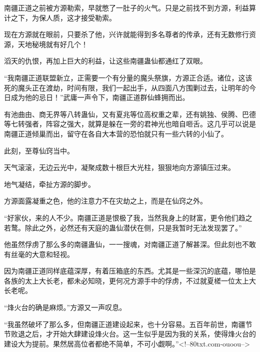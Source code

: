 \begin{this_body}
南疆正道之前被方源勒索，早就憋了一肚子的火气。只是之前找不到方源，利益算计之下，为保人质，这才接受勒索。

现在方源就在眼前，只要杀了他，兴许就能得到多名尊者的传承，还有无数修行资源，天地秘境就有好几个！

滔天的仇恨，再加上巨大的利益，让这些南疆蛊仙都通红了双眼。

“我南疆正道联盟新立，正需要一个有分量的魔头祭旗，方源正合适。诸位，这该死的魔头正在渡劫，时间有限，我们一起出手，从四面八方围剿过去，让明年的今日成为他的忌日！”武庸一声令下，南疆正道群仙蜂拥而出。

有池曲由、商无界等八转蛊仙，又有夏兆等位高权重之辈，还有姚独、侯腾、巴德等七转强者，阵容之强大，就算是躲在一旁的君神光也暗自咂舌。这几乎可以说是南疆正道倾巢而出，留守在各自大本营的恐怕就只有一些六转的小仙了。

此刻，至尊仙窍当中。

天气滚滚，无边云光中，凝聚成数十根巨大光柱，狠狠地向方源镇压过来。

地气凝结，牵扯方源的脚步。

方源面露凝重之色，他的注意力不在灾劫之上，而是在仙窍之外。

“好家伙，来的人不少。南疆正道是恨极了我，当然我身上的财富，更令他们趋之若鹜。除此之外，必然还有天庭的蛊仙潜伏在侧，只是我暂时无法发现罢了。”

他虽然俘虏了那么多的南疆蛊仙，一一搜魂，对南疆正道了解甚深。但此刻也不敢有丝毫的大意和轻视。

因为南疆正道同样底蕴深厚，有着压箱底的东西。尤其是一些深沉的底蕴，哪怕是各族的太上大长老，都未必知晓，更何况方源手中的俘虏，不过就夏槎一位太上大长老呢。

“烽火台的确是麻烦。”方源又一声叹息。

“我虽然破坏了那么多，但南疆正道建设起来，也十分容易。五百年前世，南疆节节败退之后，才开始大肆建设烽火台。这一生似乎是因为我的关系，使得烽火台的建设大为提前。果然居高位者都绝不简单，不可小觑啊。”<!--80txt.com-ouoou-->

\end{this_body}

